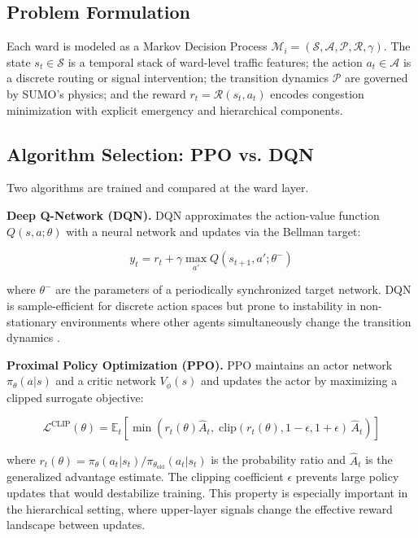 \documentclass[conference]{IEEEtran}
\begin{document}
\subsection{Problem Formulation}

Each ward is modeled as a Markov Decision Process $\mathcal{M}_i =
(\mathcal{S}, \mathcal{A}, \mathcal{P}, \mathcal{R}, \gamma)$.
The state $s_t \in \mathcal{S}$ is a temporal stack of ward-level traffic
features; the action $a_t \in \mathcal{A}$ is a discrete routing or signal
intervention; the transition dynamics $\mathcal{P}$ are governed by SUMO's
physics; and the reward $r_t = \mathcal{R}(s_t, a_t)$ encodes congestion
minimization with explicit emergency and hierarchical components.

\subsection{Algorithm Selection: PPO vs. DQN}

Two algorithms are trained and compared at the ward layer.

\textbf{Deep Q-Network (DQN).}
DQN approximates the action-value function $Q(s, a; \theta)$ with a neural
network and updates via the Bellman target:

\begin{equation}
y_t = r_t + \gamma \max_{a'} Q(s_{t+1}, a'; \theta^-)
\label{eq:bellman}
\end{equation}

where $\theta^-$ are the parameters of a periodically synchronized target
network. DQN is sample-efficient for discrete action spaces but prone to
instability in non-stationary environments where other agents simultaneously
change the transition dynamics \cite{marl2025sciencedirect}.

\textbf{Proximal Policy Optimization (PPO).}
PPO \cite{hier2024naturereports} maintains an actor network $\pi_\theta(a|s)$
and a critic network $V_\phi(s)$ and updates the actor by maximizing a
clipped surrogate objective:

\begin{equation}
\mathcal{L}^{\text{CLIP}}(\theta) = \mathbb{E}_t \left[ \min\left(
r_t(\theta) \hat{A}_t,\;
\text{clip}(r_t(\theta), 1-\epsilon, 1+\epsilon)\, \hat{A}_t
\right) \right]
\label{eq:ppo_clip}
\end{equation}

where $r_t(\theta) = \pi_\theta(a_t|s_t) / \pi_{\theta_\text{old}}(a_t|s_t)$
is the probability ratio and $\hat{A}_t$ is the generalized advantage estimate.
The clipping coefficient $\epsilon$ prevents large policy updates that would
destabilize training. This property is especially important in the hierarchical
setting, where upper-layer signals change the effective reward landscape
between updates.
\end{document}
